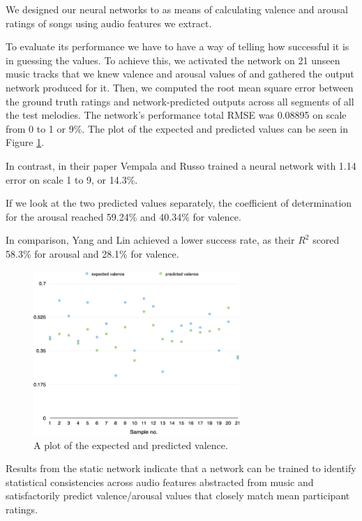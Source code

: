We designed our neural networks to as means of calculating valence and arousal ratings of songs using audio features we extract. 

To evaluate its performance we have to have a way of telling how successful it is in guessing the values. To achieve this, we activated the network on 21 unseen music tracks that we knew valence and arousal values of and gathered the output network produced for it. Then, we computed the root mean square error between the ground truth ratings and network-predicted outputs across all segments of all the test melodies. The network's performance total RMSE was 0.08895 on scale from 0 to 1 or 9\%. The plot of the expected and predicted values can be seen in Figure \ref{fig:anneval}.

In contrast, in their paper \cite{vempala} Vempala and Russo trained a neural network with 1.14 error on scale 1 to 9, or 14.3\%.

If we look at the two predicted values separately, the coefficient of determination for the arousal reached 59.24\% and 40.34\% for valence.

In comparison, Yang and Lin \cite{mood} achieved a lower success rate, as their $R^2$ scored 58.3\% for arousal and 28.1\% for valence. 


\begin{figure}[t]
    \includegraphics[width=0.7\textwidth]{Figures/finalvalence}
    \centering

  \caption{A plot of the expected and predicted valence.}
  \label{fig:anneval}
\end{figure}


Results from the static network indicate that a network can be trained to identify statistical consistencies across audio features abstracted from music and satisfactorily predict valence/arousal values that closely match mean participant ratings.


